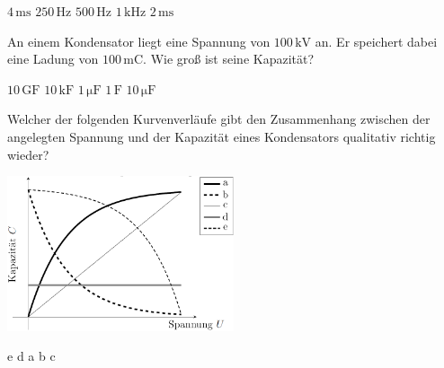 \documentclass[11pt]{exam}
\begin{document}
\begin{questions}
\begin{choices}
	\choice \(\mathrm{4\,ms}\)
	\choice \(\mathrm{250\,Hz}\)
	\choice \(\mathrm{500\,Hz}\)
	\choice \(\mathrm{1\,kHz}\)
	\choice \(\mathrm{2\,ms}\)
\end{choices}

\vspace{3mm}\question An einem Kondensator liegt eine Spannung von \(\mathrm{100\,kV}\) an. Er speichert dabei eine Ladung von \(\mathrm{100\,mC}\). Wie groß ist seine Kapazität?

\begin{choices}
	\choice \(\mathrm{10\,GF}\)
	\choice \(\mathrm{10\,kF}\)
	\choice \(\mathrm{1\,\mu F}\)
	\choice \(\mathrm{1\,F}\)
	\choice \(\mathrm{10\,\mu F}\)
\end{choices}

\vspace{3mm}\question Welcher der folgenden Kurvenverläufe gibt den Zusammenhang zwischen der angelegten Spannung und der Kapazität eines Kondensators qualitativ richtig wieder? 

\includegraphics[width=0.5\textwidth]{../../../questions/D/images/Kondensator-C-U.png}

\begin{choices}
	\choice e
	\choice d
	\choice a
	\choice b
	\choice c
\end{choices}

\vspace{3mm}\end{questions}
\end{document}
